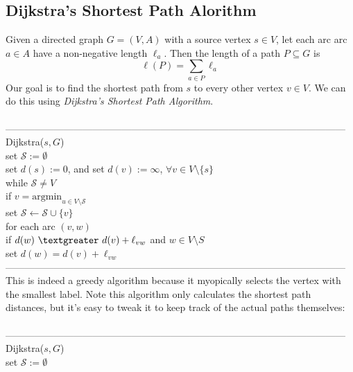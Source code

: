 \documentclass{article}
\newcommand{\ti}[1]{\textit{#1}}
\newcommand{\emp}{\emptyset}
\newcommand{\gt}{\textgreater}
\newcommand{\ds}{\displaystyle}
\newcommand{\mcal}[1]{\mathcal{#1}}
\begin{document}
\subsection{Dijkstra's Shortest Path Alorithm}
Given a directed graph $G = (V, A)$ with a source vertex $s \in V$, let each arc arc $a \in A$ have a non-negative length $\ell_a$. Then the length of a path $P \subseteq G$ is
\[\ell(P) = \sum_{a \in P} \ell_a\]
Our goal is to find the shortest path from $s$ to every other vertex $v \in V$. We can do this using \ti{Dijkstra's Shortest Path Algorithm}.\\\\
---------------------------------------------------------------------------------------------------------
Dijkstra($s, G$)\\
	\hspace*{7mm} set $\mcal{S} := \emp$\\
	\hspace*{7mm} set $d(s) := 0$, and set $d(v) := \infty$, $\forall v \in V\setminus \{s\}$\\
	\hspace*{7mm} while $\mcal{S} \neq V$\\
	\hspace*{14mm} if $\ds v = \text{argmin}_{u \in V \setminus \mcal{S}}$\\
	\hspace*{21mm} set $\mcal{S} \leftarrow \mcal{S} \cup \{v\}$\\
	\hspace*{14mm} for each arc $(v, w)$\\
	\hspace*{21mm} if $d(w)\ \gt\ d(v) + \ell_{vw}$ and $w \in V\setminus S$\\
	\hspace*{28mm} set $d(w) = d(v) + \ell_{vw}$\\
---------------------------------------------------------------------------------------------------------\\
This is indeed a greedy algorithm because it myopically selects the vertex with the smallest label. Note this algorithm only calculates the shortest path distances, but it's easy to tweak it to keep track of the actual paths themselves:\\\\
---------------------------------------------------------------------------------------------------------
Dijkstra($s, G$)\\
	\hspace*{7mm} set $\mcal{S} := \emp$\\
\end{document}

